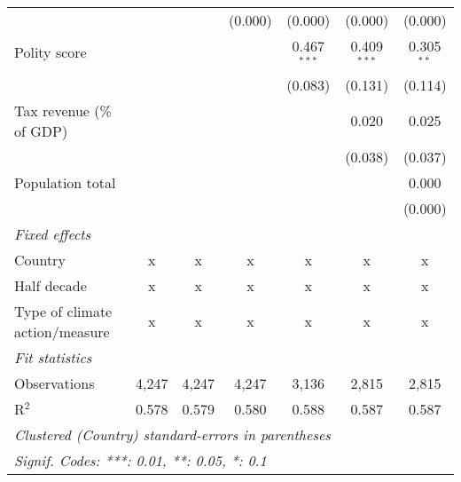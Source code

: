 \begin{tabular}{lcccccc}
                                                                                          &         &               & (0.000)        & (0.000)        & (0.000)        & (0.000)\\   
   Polity score                                                                           &         &               &                & 0.467$^{***}$  & 0.409$^{***}$  & 0.305$^{**}$\\   
                                                                                          &         &               &                & (0.083)        & (0.131)        & (0.114)\\   
   Tax revenue (\% of GDP)                                                                &         &               &                &                & 0.020          & 0.025\\   
                                                                                          &         &               &                &                & (0.038)        & (0.037)\\   
   Population total                                                                       &         &               &                &                &                & 0.000\\   
                                                                                          &         &               &                &                &                & (0.000)\\   
   \emph{Fixed effects}\\
   Country                                                                                & x       & x             & x              & x              & x              & x\\  
   Half decade                                                                            & x       & x             & x              & x              & x              & x\\  
   Type of climate action/measure                                                         & x       & x             & x              & x              & x              & x\\  
   \midrule \emph{Fit statistics}\\
   Observations                                                                           & 4,247   & 4,247         & 4,247          & 3,136          & 2,815          & 2,815\\  
   R$^2$                                                                                  & 0.578   & 0.579         & 0.580          & 0.588          & 0.587          & 0.587\\  
   \midrule
   \multicolumn{7}{l}{\emph{Clustered (Country) standard-errors in parentheses}}\\
   \multicolumn{7}{l}{\emph{Signif. Codes: ***: 0.01, **: 0.05, *: 0.1}}\\
\end{tabular}
\par\endgroup


